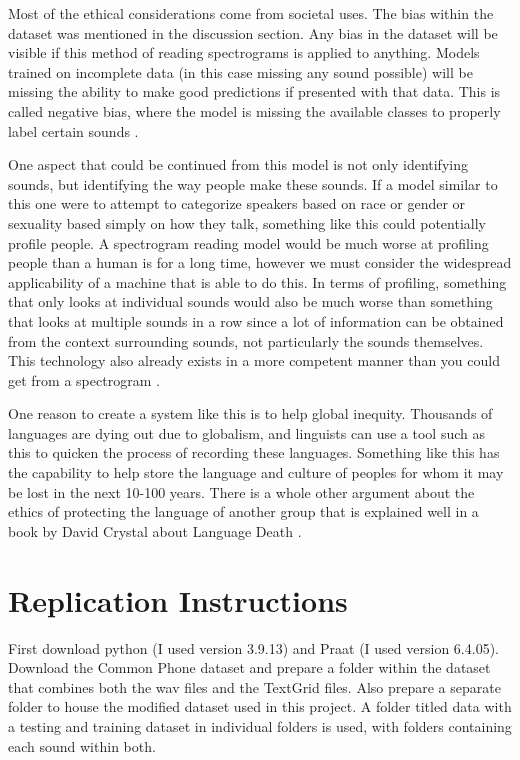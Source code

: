 \documentclass[10pt,twocolumn]{article}
\begin{document}
Most of the ethical considerations come from societal uses. The bias within the dataset was mentioned in the discussion section. Any bias in the dataset will be visible if this method of reading spectrograms is applied to anything. Models trained on incomplete data (in this case missing any sound possible) will be missing the ability to make good predictions if presented with that data. This is called negative bias, where the model is missing the available classes to properly label certain sounds \cite{DatasetBias}. 

One aspect that could be continued from this model is not only identifying sounds, but identifying the way people make these sounds. If a model similar to this one were to attempt to categorize speakers based on race or gender or sexuality based simply on how they talk, something like this could potentially profile people. A spectrogram reading model would be much worse at profiling people than a human is for a long time, however we must consider the widespread applicability of a machine that is able to do this. In terms of profiling, something that only looks at individual sounds would also be much worse than something that looks at multiple sounds in a row since a lot of information can be obtained from the context surrounding sounds, not particularly the sounds themselves. This technology also already exists in a more competent manner than you could get from a spectrogram \cite{Profiling}.

One reason to create a system like this is to help global inequity. Thousands of languages are dying out due to globalism, and linguists can use a tool such as this to quicken the process of recording these languages. Something like this has the capability to help store the language and culture of peoples for whom it may be lost in the next 10-100 years. There is a whole other argument about the ethics of protecting the language of another group that is explained well in a book by David Crystal about Language Death \cite{LanguageDeath}.

\section{Replication Instructions}

First download python (I used version 3.9.13) and Praat (I used version 6.4.05). Download the Common Phone dataset \cite{CommonPhone} and prepare a folder within the dataset that combines both the wav files and the TextGrid files. Also prepare a separate folder to house the modified dataset used in this project. A folder titled data with a testing and training dataset in individual folders is used, with folders containing each sound within both. 
	
\end{document}
